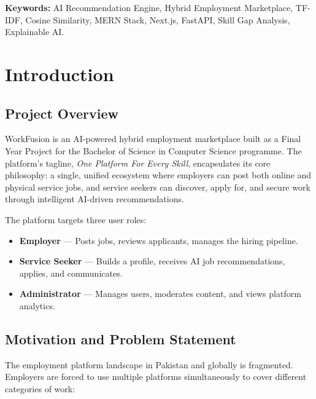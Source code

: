 \documentclass[12pt,a4paper,oneside]{report}
\begin{document}
\vspace{1cm}
\noindent\textbf{Keywords:} AI Recommendation Engine, Hybrid Employment Marketplace, TF-IDF, Cosine Similarity, MERN Stack, Next.js, FastAPI, Skill Gap Analysis, Explainable AI.

\tableofcontents
\listoffigures
\listoftables

\chapter{Introduction}

\section{Project Overview}

WorkFusion is an AI-powered hybrid employment marketplace built as a Final Year Project for the Bachelor of Science in Computer Science programme. The platform's tagline, \textit{One Platform For Every Skill}, encapsulates its core philosophy: a single, unified ecosystem where employers can post both online and physical service jobs, and service seekers can discover, apply for, and secure work through intelligent AI-driven recommendations.

The platform targets three user roles:
\begin{itemize}[noitemsep]
  \item \textbf{Employer} — Posts jobs, reviews applicants, manages the hiring pipeline.
  \item \textbf{Service Seeker} — Builds a profile, receives AI job recommendations, applies, and communicates.
  \item \textbf{Administrator} — Manages users, moderates content, and views platform analytics.
\end{itemize}

\section{Motivation and Problem Statement}

The employment platform landscape in Pakistan and globally is fragmented. Employers are forced to use multiple platforms simultaneously to cover different categories of work:
\end{document}

